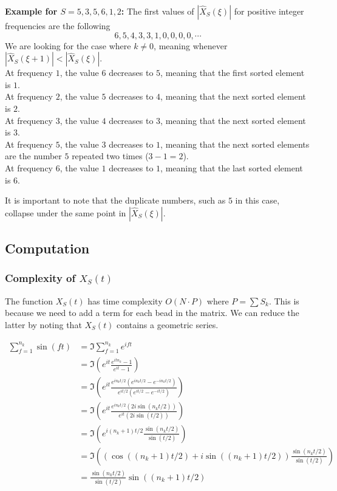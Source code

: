\documentclass{article}
\begin{document}
\textbf{Example for \(S = 5,3,5,6,1,2\):}
The first values of \(|\hat{X}_S(\xi)|\) for positive integer frequencies are the following
\[
    6, 5, 4, 3, 3, 1, 0, 0, 0, 0, \cdots
\]
We are looking for the case where \(k \neq 0\), meaning whenever
\(|\hat{X}_S(\xi+1)| < |\hat{X}_S(\xi)|\). \\
At frequency \(1\), the value \(6\) decreases to \(5\), meaning that the first sorted element is \(1\). \\
At frequency \(2\), the value \(5\) decreases to \(4\), meaning that the next sorted element is \(2\). \\
At frequency \(3\), the value \(4\) decreases to \(3\), meaning that the next sorted element is \(3\). \\
At frequency \(5\), the value \(3\) decreases to \(1\), meaning that the next sorted elements are the number \(5\)
repeated two times (\(3-1=2\)). \\
At frequency \(6\), the value \(1\) decreases to \(1\), meaning that the last sorted element is \(6\).

It is important to note that the duplicate numbers,
such as \(5\) in this case, collapse under the same
point in \(|\hat{X}_S(\xi)|\).

\pagebreak

\subsection{Computation}

\subsubsection{Complexity of \(X_S(t)\)}

The function \(X_S(t)\) has time complexity \(O(N\cdot P)\) where
\(P=\sum S_k\).
This is because we need to add a term for each bead in the matrix.
We can reduce the latter by noting that \(X_S(t)\) contains
a geometric series.

\begin{align*}
    \sum_{f=1}^{n_k} \sin(ft) 
    &= \Im \sum_{f=1}^{n_k} e^{ift} \\
    &= \Im \left( e^{it} \frac{e^{itn_k}-1}{e^{it}-1} \right) \\
    &= \Im \left( e^{it} \frac{e^{in_kt/2}(e^{in_kt/2} - e^{-in_kt/2})}
        {e^{it/2}(e^{it/2} - e^{-it/2})} \right) \\
    &= \Im \left( e^{it} \frac{e^{in_kt/2}(2i\sin(n_kt/2))}
        {e^{it} (2i\sin(t/2))} \right) \\
    &= \Im \left( e^{i(n_k+1)t/2} \frac{\sin(n_k t/2)}{\sin(t/2)} \right) \\
    &= \Im \left(
            ( \cos((n_k+1)t/2) + i\sin((n_k+1)t/2)) \frac{\sin(n_k t/2)}{\sin(t/2)}
        \right) \\
    &= \frac{\sin(n_k t/2)}{\sin(t/2)} \sin((n_k+1)t/2)
\end{align*}
\end{document}

